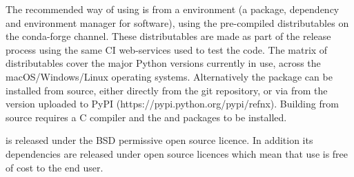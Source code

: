 \documentclass[12pt]{article}
\begin{document}
 The recommended way of using  is from a \conda environment (a package, dependency and environment manager for software), using the pre-compiled distributables on the  conda-forge channel. These distributables are made as part of the release process using the same CI web-services used to test the code. The matrix of distributables cover the major Python versions currently in use, across the macOS/Windows/Linux operating systems. Alternatively the package can be installed from source, either directly from the git repository, or via \pip from the version uploaded to PyPI (https://pypi.python.org/pypi/refnx). Building from source requires a C compiler and the \Cython and \NumPy packages to be installed.
  
 is released under the BSD permissive open source licence. In addition its dependencies are released under open source licences which mean that use is free of cost to the end user.
\end{document}
